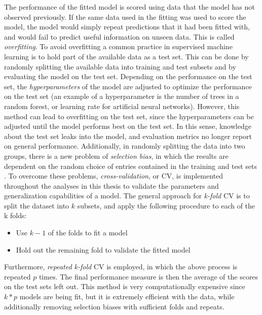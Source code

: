 \documentclass[a4paper, twoside, final, 12pt]{article}
\begin{document}
The performance of the fitted model is scored using data that the model has not observed previously.
If the same data used in the fitting was used to score the model, the model would simply repeat predictions that  it had been fitted with, and would fail to predict useful information on  unseen data.
This is called \textit{overfitting}. To avoid overfitting a common practice in supervised machine learning is to hold part of the available data as a test set.
This can be done by randomly splitting the available data into training and test subsets and by evaluating the model on the test set.
Depending on the performance on the test set, the \textit{hyperparameters} of the model are adjusted to optimize the performance on the test set  (an example of a hyperparameter is the number of trees in a random forest, or learning rate for artificial neural networks).
However, this method can lead to overfitting on the test set, since the hyperparameters can be adjusted until the model performs best on the test set.
In this sense, knowledge about the test set leaks into the model, and evaluation metrics no longer report on general performance.
Additionally, in randomly splitting the data into two groups, there is a new problem of \textit{selection bias}, in which the results are dependent on the random choice of entries contained in the training and test sets \cite{Selection_Bias}.
To overcome these problems, \textit{cross-validation}, or CV, is implemented throughout the analyses in this thesis to validate the parameters and generalization capabilities of a model.
The general approach for \textit{k-fold} CV is to split the dataset into $k$ subsets, and apply the following procedure to each of the k folds:
\begin{itemize}
	\item Use $k-1$ of the folds to fit a model 
	\item Hold out the remaining fold to validate the fitted model
\end{itemize}
Furthermore, \textit{repeated k-fold} CV is employed, in which the above process is repeated $p$ times.
The final performance measure is then the average of the scores on the test sets left out.
This method is very computationally expensive since $k*p$ models are being fit, but it is extremely efficient with the data, while additionally removing selection biases with sufficient folds and repeats.
\end{document}
